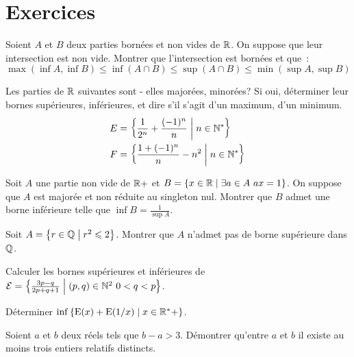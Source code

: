 \clearpage

\section{Exercices}

\begin{exercice}
  Soient \(A\) et \(B\) deux parties bornées et non vides de \(\mathbb{R}\). On suppose 
  que leur intersection est non vide. Montrer que l'intersection est bornées et 
  que~:
  \[\max(\inf A, \inf B) \leqslant \inf(A \cap B) \leqslant \sup(A \cap B) 
  \leqslant \min(\sup A, \sup B)\]
\end{exercice}

\begin{exercice}
  Les parties de \(\mathbb{R}\) suivantes sont - elles majorées, minorées? Si oui, 
  déterminer leur bornes supérieures, inférieures, et dire s'il s'agit d'un 
  maximum, d'un minimum.
  \begin{align*}
    E &= \left\{\frac{1}{2^n} + \frac{( - 1)^n}{n}\mathrel{}\middle|\mathrel{}n \in \mathbb{N}^*\right\} \\
    F &= \left\{\frac{1 + ( - 1)^n}{n} - n^2\mathrel{}\middle|\mathrel{}n \in \mathbb{N}^*\right\}
  \end{align*}
\end{exercice}

\begin{exercice}
  Soit \(A\) une partie non vide de \(\mathbb{R} + \) et \(B = \left\{x \in \mathbb{R}\mathrel{}\middle|\mathrel{}\exists 
  a \in A \ ax = 1\right\}\). On suppose que \(A\) est majorée et non réduite au 
  singleton nul. Montrer que \(B\) admet une borne inférieure telle que \(\inf B 
  = \frac{1}{\sup A}\).
\end{exercice}

\begin{exercice}
  Soit \(A = \left\{r \in \mathbb{Q}\mathrel{}\middle|\mathrel{}r^2 \leqslant 2\right\}\). Montrer que \(A\) n'admet pas 
  de borne supérieure dans \(\mathbb{Q}\).
\end{exercice}

\begin{exercice}
  Calculer les bornes supérieures et inférieures de \(\mathcal{E} = 
  \left\{\frac{3p - q}{2p + q + 1}\mathrel{}\middle|\mathrel{}(p, q) \in \mathbb{N}^2 \ 0 <q<p\right\}\).
\end{exercice}

\begin{exercice}
  Déterminer \(\inf \left\{\operatorname{E}(x) + \operatorname{E}(1/x)\mathrel{}\middle|\mathrel{}x \in \mathbb{R}^* + \right\}\).
\end{exercice}

\begin{exercice}
  Soient \(a\) et \(b\) deux réels tels que \(b - a>3\). Démontrer qu'entre 
  \(a\) et \(b\) il existe au moins trois entiers relatifs distincts.
\end{exercice}

